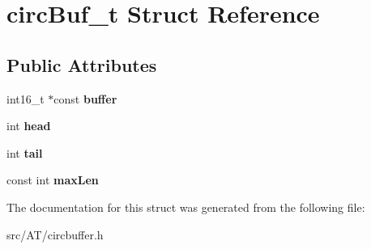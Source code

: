 \hypertarget{structcircBuf__t}{}\section{circ\+Buf\+\_\+t Struct Reference}
\label{structcircBuf__t}
\subsection*{Public Attributes}
\begin{DoxyCompactItemize}
\item 
\mbox{\label{structcircBuf__t_a474bd20e8c41a56a2da5e38ea52eb76a}} 
int16\+\_\+t $\ast$const {\bfseries buffer}
\item 
\mbox{\label{structcircBuf__t_a3333fc686d6e7d5ca4b475597e709c43}} 
int {\bfseries head}
\item 
\mbox{\label{structcircBuf__t_ad5ba3bfc99ec0466d8f9bbe9b6915f7b}} 
int {\bfseries tail}
\item 
\mbox{\label{structcircBuf__t_a7741b11b0c8be7dedad7355d47740728}} 
const int {\bfseries max\+Len}
\end{DoxyCompactItemize}


The documentation for this struct was generated from the following file\+:\begin{DoxyCompactItemize}
\item 
src/\+A\+T/circbuffer.\+h\end{DoxyCompactItemize}

